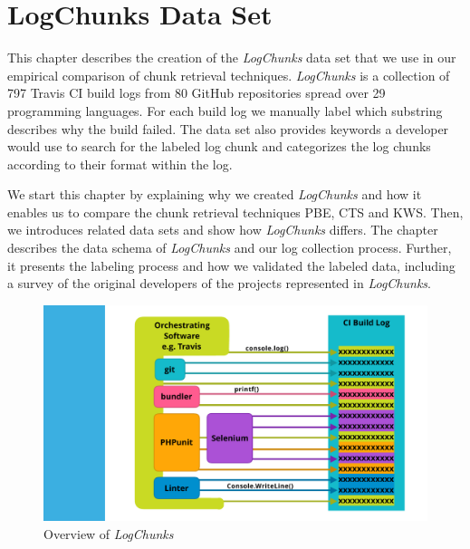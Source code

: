 \documentclass[\myrootdir/main.tex]{subfiles}
\begin{document}
\chapter{LogChunks Data Set}
\label{sec:data-set}

This chapter describes the creation of the \emph{LogChunks} data set that we use in our empirical comparison of chunk retrieval techniques.
\emph{LogChunks} is a collection of 797 Travis CI build logs from 80 GitHub repositories spread over 29 programming languages.
For each build log we manually label which substring describes why the build failed.
The data set also provides keywords a developer would use to search for the labeled log chunk and categorizes the log chunks according to their format within the log.

We start this chapter by explaining why we created \emph{LogChunks} and how it enables us to compare the chunk retrieval techniques PBE, CTS and KWS\@.
Then, we introduces related data sets and show how \emph{LogChunks} differs.
The chapter describes the data schema of \emph{LogChunks} and our log collection process.
Further, it presents the labeling process and how we validated the labeled data, including a survey of the original developers of the projects represented in \emph{LogChunks}.

\begin{figure}[htbp]
	\centering
	\includegraphics[page=3, width=\textwidth, trim={2cm 2cm 2cm 0.5cm}, clip]{img/overview-graphics.pdf}
	\caption{Overview of \emph{LogChunks}}
	\label{fig:lc-overview}
\end{figure}
\end{document}

